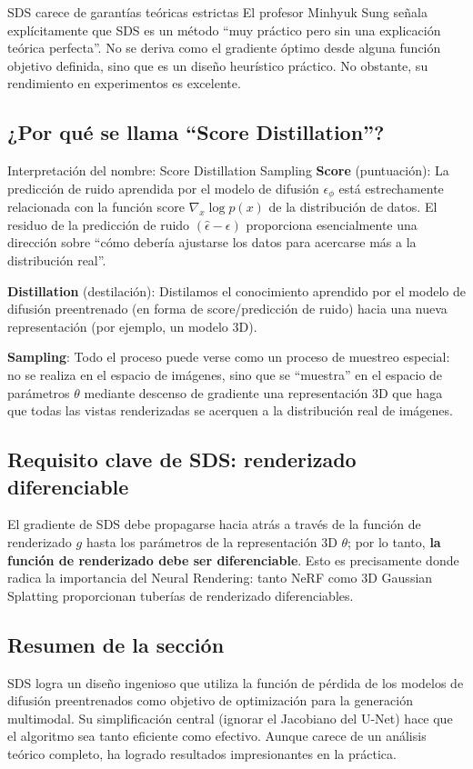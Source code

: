 \begin{warningbox}{SDS carece de garantías teóricas estrictas}
El profesor Minhyuk Sung señala explícitamente que SDS es un método ``muy práctico pero sin una explicación teórica perfecta''. No se deriva como el gradiente óptimo desde alguna función objetivo definida, sino que es un diseño heurístico práctico. No obstante, su rendimiento en experimentos es excelente.
\end{warningbox}

\subsection{¿Por qué se llama ``Score Distillation''?}

\begin{knowledgebox}{Interpretación del nombre: Score Distillation Sampling}
\textbf{Score} (puntuación): La predicción de ruido aprendida por el modelo de difusión $\epsilon_\phi$ está estrechamente relacionada con la función score $\nabla_x \log p(x)$ de la distribución de datos. El residuo de la predicción de ruido $(\hat{\epsilon} - \epsilon)$ proporciona esencialmente una dirección sobre ``cómo debería ajustarse los datos para acercarse más a la distribución real''.

\textbf{Distillation} (destilación): Distilamos el conocimiento aprendido por el modelo de difusión preentrenado (en forma de score/predicción de ruido) hacia una nueva representación (por ejemplo, un modelo 3D).

\textbf{Sampling}: Todo el proceso puede verse como un proceso de muestreo especial: no se realiza en el espacio de imágenes, sino que se ``muestra'' en el espacio de parámetros $\theta$ mediante descenso de gradiente una representación 3D que haga que todas las vistas renderizadas se acerquen a la distribución real de imágenes.
\end{knowledgebox}

\subsection{Requisito clave de SDS: renderizado diferenciable}

El gradiente de SDS debe propagarse hacia atrás a través de la función de renderizado $g$ hasta los parámetros de la representación 3D $\theta$; por lo tanto, \textbf{la función de renderizado debe ser diferenciable}. Esto es precisamente donde radica la importancia del Neural Rendering: tanto NeRF como 3D Gaussian Splatting proporcionan tuberías de renderizado diferenciables.

\subsection{Resumen de la sección}

SDS logra un diseño ingenioso que utiliza la función de pérdida de los modelos de difusión preentrenados como objetivo de optimización para la generación multimodal. Su simplificación central (ignorar el Jacobiano del U-Net) hace que el algoritmo sea tanto eficiente como efectivo. Aunque carece de un análisis teórico completo, ha logrado resultados impresionantes en la práctica.

\newpage
